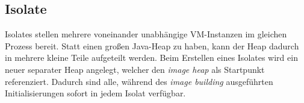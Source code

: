 \subsection{Isolate}
\label{subsec:isolate}

Isolates stellen mehrere voneinander unabhängige VM-Instanzen im gleichen Prozess bereit. Statt einen großen Java-Heap zu haben,
kann der Heap dadurch in mehrere kleine Teile aufgeteilt werden. Beim Erstellen eines Isolates wird ein neuer separater 
Heap angelegt, welcher den \textit{image heap} als Startpunkt referenziert. Dadurch sind alle, während des \textit{image building}
ausgeführten Initialisierungen sofort in jedem Isolat verfügbar. 